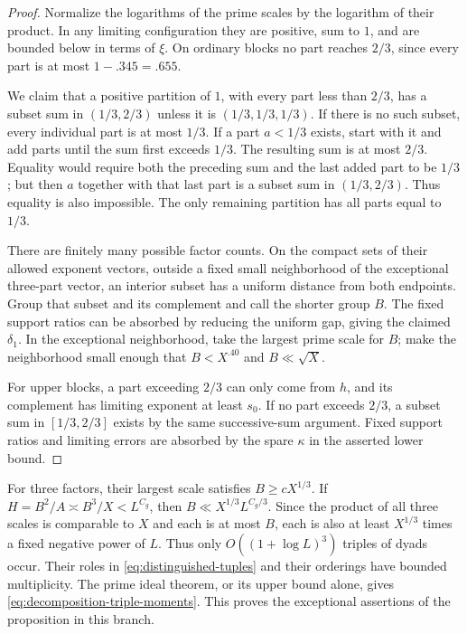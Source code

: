 \begin{proof}
Normalize the logarithms of the prime scales by the logarithm of their
product.  In any limiting configuration they are positive, sum to $1$,
and are bounded below in terms of $\xi$.  On ordinary blocks no part
reaches $2/3$, since every part is at most $1-.345=.655$.

We claim that a positive partition of $1$, with every part less than
$2/3$, has a subset sum in $(1/3,2/3)$ unless it is
$(1/3,1/3,1/3)$.  If there is no such subset, every individual part
is at most $1/3$.  If a part $a<1/3$ exists, start with it and add
parts until the sum first exceeds $1/3$.  The resulting sum is at
most $2/3$.  Equality would require both the preceding sum and the
last added part to be $1/3$; but then $a$ together with that last part
is a subset sum in $(1/3,2/3)$.  Thus equality is also impossible.
The only remaining partition has all parts equal to $1/3$.

There are finitely many possible factor counts.  On the compact sets
of their allowed exponent vectors, outside a fixed small neighborhood
of the exceptional three-part vector, an interior subset has a
uniform distance from both endpoints.  Group that subset and its
complement and call the shorter group $B$.  The fixed support ratios
can be absorbed by reducing the uniform gap, giving the claimed
$\delta_1$.  In the exceptional neighborhood, take the largest prime
scale for $B$; make the neighborhood small enough that $B<X^{.40}$
and $B\ll\sqrt X$.

For upper blocks, a part exceeding $2/3$ can only come from $h$,
and its complement has limiting exponent at least $s_0$.
If no part exceeds $2/3$, a subset sum in $[1/3,2/3]$ exists by the
same successive-sum argument.  Fixed support ratios and limiting
errors are absorbed by the spare $\kappa$ in the asserted lower bound.
\end{proof}

For three factors, their largest scale satisfies $B\ge cX^{1/3}$.
If $H=B^2/A\asymp B^3/X<L^{C_g}$, then $B\ll X^{1/3}L^{C_g/3}$.
Since the product of all three scales is comparable to $X$ and each
is at most $B$, each is also at least $X^{1/3}$ times a fixed negative
power of $L$.  Thus only $O((1+\log L)^3)$ triples of dyads occur.
Their roles in \eqref{eq:distinguished-tuples} and their orderings
have bounded multiplicity.  The prime ideal theorem, or its upper
bound alone, gives \eqref{eq:decomposition-triple-moments}.
This proves the exceptional assertions of the proposition in this branch.

